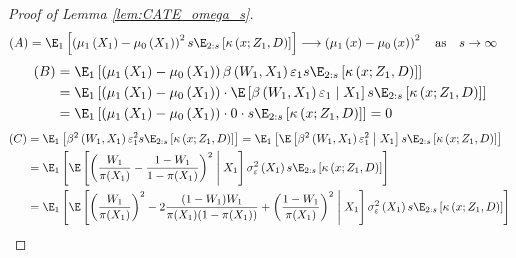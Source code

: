 \begin{proof}[Proof of Lemma \ref{lem:CATE_omega_s}]
    \begin{equation}
        \begin{aligned}
            (A) 
            & = \E_{1}\left[\left(\mu_{1}\left(X_1\right) - \mu_{0}\left(X_1\right)\right)^2 s \E_{2:s}\left[\kappa\left(x; Z_1, D\right)\right]\right]
            \longrightarrow \left(\mu_{1}\left(x\right) - \mu_{0}\left(x\right)\right)^2
            \quad \text{as} \quad s \rightarrow \infty
        \end{aligned}
    \end{equation}
    \begin{equation}
        \begin{aligned}
            (B)
            & = \E_{1}\left[\left(\mu_{1}\left(X_1\right) - \mu_{0}\left(X_1\right)\right)\beta\left(W_{1}, X_1\right)\varepsilon_1 s \E_{2:s}\left[\kappa\left(x; Z_1, D\right)\right]\right] \\
            & = \E_{1}\left[\left(\mu_{1}\left(X_1\right) - \mu_{0}\left(X_1\right)\right) \cdot \E\left[\beta\left(W_{1}, X_1\right)\varepsilon_1 \; \middle| \; X_1\right] s \E_{2:s}\left[\kappa\left(x; Z_1, D\right)\right]\right] \\
            & = \E_{1}\left[\left(\mu_{1}\left(X_1\right) - \mu_{0}\left(X_1\right)\right) \cdot 0 \cdot s \E_{2:s}\left[\kappa\left(x; Z_1, D\right)\right]\right] 
            = 0
        \end{aligned}
    \end{equation}
    \newpage
    \begin{equation}
        \begin{aligned}
            (C)
            & = \E_{1}\left[\beta^2\left(W_{1}, X_1\right)\varepsilon_1^2 s \E_{2:s}\left[\kappa\left(x; Z_1, D\right)\right]\right] 
            = \E_{1}\left[\E\left[\beta^2\left(W_{1}, X_1\right)\varepsilon_1^2 \; \middle| \; X_1\right] s \E_{2:s}\left[\kappa\left(x; Z_1, D\right)\right]\right] \\
            & = \E_{1}\left[\E\left[\left(\frac{W_{1}}{\pi(X_1)} - \frac{1 - W_{1}}{1 - \pi(X_1)}\right)^2 \; \middle| \; X_1\right] \sigma_{\varepsilon}^2\left(X_1\right) s \E_{2:s}\left[\kappa\left(x; Z_1, D\right)\right]\right] \\
            & = \E_{1}\left[\E\left[\left(\frac{W_{1}}{\pi(X_1)}\right)^2 - 2 \frac{(1 - W_{1})W_{1}}{\pi(X_1)(1 - \pi(X_1))} + \left(\frac{1 - W_{1}}{\pi(X_1)}\right)^2 \; \middle| \; X_1\right] \sigma_{\varepsilon}^2\left(X_1\right) s \E_{2:s}\left[\kappa\left(x; Z_1, D\right)\right]\right] \\ 

\end{aligned}
\end{equation}
\end{proof}
